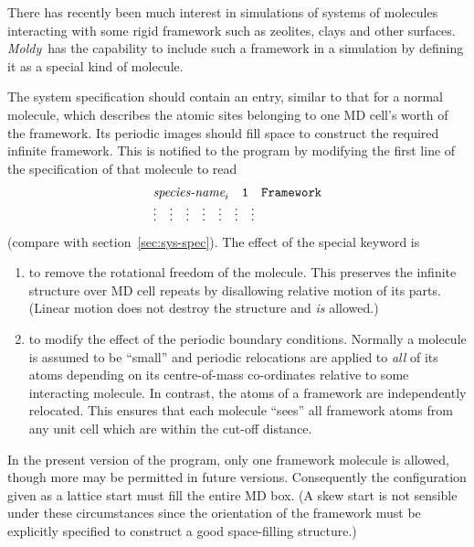 \documentclass[a4paper,twoside]{report}
\newcommand{\moldy}{\emph{Moldy}}
\begin{document}
There has recently been much interest in simulations of systems of
molecules interacting with some rigid framework such as zeolites,
clays and other surfaces.  \moldy\  has the capability to include such a
framework in a simulation by defining it as a special kind of molecule.

The system specification should contain an entry, similar to that for
a normal molecule, which describes the atomic sites belonging to one
MD cell's worth of the framework.  Its periodic images should fill
space to construct the required infinite framework.  This is notified
to the program by modifying the first line of the specification of
that molecule to read
\begin{displaymath}
\begin{array}{lllllll}
\multicolumn{7}{l}{\textit{species-name}_{i} %
                  \quad \Lit{1} \quad \Lit{Framework}}  \\
\vdots & \vdots & \vdots & \vdots & \vdots & \vdots & \vdots \\
\end{array}
\end{displaymath}
(compare with section~\ref{sec:sys-spec}).  The effect of the special
keyword  is
\begin{enumerate}
\item to remove the rotational freedom of the molecule.  This
preserves the infinite structure over MD cell repeats by disallowing
relative motion of its parts. (Linear motion does not destroy the
structure and \emph{is} allowed.)
\item to modify the effect of the periodic boundary conditions.
Normally a molecule is assumed to be ``small'' and periodic relocations
are applied to \emph{all} of its atoms depending on its centre-of-mass
co-ordinates relative to some interacting molecule.  In contrast, the
atoms of a framework are independently relocated.  This ensures that
each molecule ``sees'' all framework atoms from any unit cell which
are within the cut-off distance.
\end{enumerate}

In the present version of the program, only one framework molecule is
allowed, though more may be permitted in future versions. Consequently
the configuration given as a lattice start must fill the entire MD
box. (A skew start is not sensible under these circumstances since the
orientation of the framework must be explicitly specified to construct
a good space-filling structure.)
\end{document}
